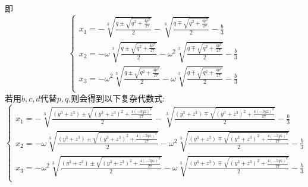 \documentclass[UTF8]{ctexart}
\begin{document}
即
\[\begin{cases}
x_{1}=-\sqrt[3]{\frac{q\pm\sqrt{q^{2}+\frac{4p^{3}}{27}}}{2}}-\sqrt[3]{\frac{q\mp\sqrt{q^{2}+\frac{4p^{3}}{27}}}{2}}-\frac{b}{3}\\
x_{2}=-\omega \sqrt[3]{\frac{q\pm\sqrt{q^{2}+\frac{4p^{3}}{27}}}{2}}-\omega ^{2}\sqrt[3]{\frac{q\mp\sqrt{q^{2}+\frac{4p^{3}}{27}}}{2}}-\frac{b}{3}\\
x_{3}=-\omega ^{2}\sqrt[3]{\frac{q\pm\sqrt{q^{2}+\frac{4p^{3}}{27}}}{2}}-\omega \sqrt[3]{\frac{q\mp\sqrt{q^{2}+\frac{4p^{3}}{27}}}{2}}-\frac{b}{3}\\
\end{cases}\]
若用$b,c,d$代替$p,q$,则会得到以下复杂代数式:
\[\begin{cases}
x_{1}=-\sqrt[3]{\frac{(y^{3}+z^{3})\pm\sqrt{(y^{3}+z^{3})^{2}+\frac{4(-3yz)^{3}}{27}}}{2}}-\sqrt[3]{\frac{(y^{3}+z^{3})\mp\sqrt{(y^{3}+z^{3})^{2}+\frac{4(-3yz)^{3}}{27}}}{2}}-\frac{b}{3}\\
x_{2}=-\omega \sqrt[3]{\frac{(y^{3}+z^{3})\pm\sqrt{(y^{3}+z^{3})^{2}+\frac{4(-3yz)^{3}}{27}}}{2}}-\omega ^{2}\sqrt[3]{\frac{(y^{3}+z^{3})\mp\sqrt{(y^{3}+z^{3})^{2}+\frac{4(-3yz)^{3}}{27}}}{2}}-\frac{b}{3}\\
x_{3}=-\omega ^{2}\sqrt[3]{\frac{(y^{3}+z^{3})\pm\sqrt{(y^{3}+z^{3})^{2}+\frac{4(-3yz)^{3}}{27}}}{2}}-\omega \sqrt[3]{\frac{(y^{3}+z^{3})\mp\sqrt{(y^{3}+z^{3})^{2}+\frac{4(-3yz)^{3}}{27}}}{2}}-\frac{b}{3}\\
\end{cases}\]
\end{document}
